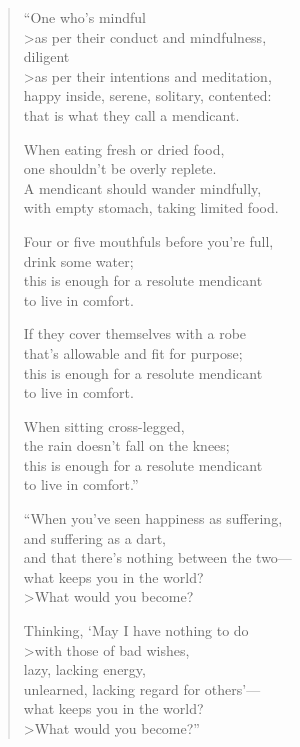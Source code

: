 \documentclass[12pt,openany]{book}%
\begin{document}
\begin{verse}%
“One who’s mindful \\>as per their conduct and mindfulness, \\
diligent \\>as per their intentions and meditation, \\
happy inside, serene, solitary, contented: \\
that is what they call a mendicant. 

When eating fresh or dried food, \\
one shouldn’t be overly replete. \\
A mendicant should wander mindfully, \\
with empty stomach, taking limited food. 

Four or five mouthfuls before you’re full, \\
drink some water; \\
this is enough for a resolute mendicant \\
to live in comfort. 

If they cover themselves with a robe \\
that’s allowable and fit for purpose; \\
this is enough for a resolute mendicant \\
to live in comfort. 

When sitting cross-legged, \\
the rain doesn’t fall on the knees; \\
this is enough for a resolute mendicant \\
to live in comfort.” 

“When you’ve seen happiness as suffering, \\
and suffering as a dart, \\
and that there’s nothing between the two—\\
what keeps you in the world? \\>What would you become? 

Thinking, ‘May I have nothing to do \\>with those of bad wishes, \\
lazy, lacking energy, \\
unlearned, lacking regard for others’—\\
what keeps you in the world? \\>What would you become?” 


\end{verse}
\end{document}
